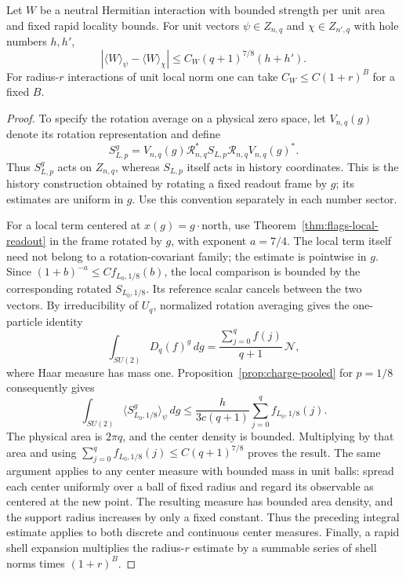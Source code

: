 \begin{corollary}\label{cor:charge-weak-average}
Let $W$ be a neutral Hermitian interaction with bounded strength per
unit area and fixed rapid locality bounds.  For unit vectors
$\psi\in Z_{n,q}$ and $\chi\in Z_{n',q}$ with hole numbers $h,h'$,
\begin{equation}\label{eq:charge-weak-average}
 |\langle W\rangle_\psi-\langle W\rangle_\chi|
 \le C_W(q+1)^{7/8}(h+h').
\end{equation}
For radius-$r$ interactions of unit local norm one can take
$C_W\le C(1+r)^B$ for a fixed $B$.
\end{corollary}

\begin{proof}
To specify the rotation average on a physical zero space, let
$V_{n,q}(g)$ denote its rotation representation and define
\[
 S_{L,p}^{g}=V_{n,q}(g)\mathcal R_{n,q}^*S_{L,p}
             \mathcal R_{n,q}V_{n,q}(g)^*.
\]
Thus $S_{L,p}^{g}$ acts on $Z_{n,q}$, whereas $S_{L,p}$ itself acts
in history coordinates.  This is the history construction obtained by
rotating a fixed readout frame by $g$; its estimates are uniform in
$g$.  Use this convention separately in each number sector.

For a local term centered at $x(g)=g\cdot\mathrm{north}$, use
Theorem~\ref{thm:flags-local-readout} in the frame rotated by $g$,
with exponent $a=7/4$.  The local term itself need not belong to a
rotation-covariant family; the estimate is pointwise in $g$.  Since
$(1+b)^{-a}\le C f_{L_0,1/8}(b)$, the local comparison is bounded
by the corresponding rotated $S_{L_0,1/8}$.  Its reference scalar
cancels between the two vectors.  By irreducibility of $U_q$,
normalized rotation averaging gives the one-particle identity
\begin{equation}\label{eq:charge-rotation-average}
 \int_{SU(2)} D_q(f)^{g}\,dg
 =\frac{\sum_{j=0}^q f(j)}{q+1}\,\mathcal N,
\end{equation}
where Haar measure has mass one.  Proposition~\ref{prop:charge-pooled}
for $p=1/8$ consequently gives
\[
 \int_{SU(2)}\langle S_{L_0,1/8}^{g}\rangle_\psi\,dg
 \le\frac{h}{3c(q+1)}\sum_{j=0}^q f_{L_0,1/8}(j).
\]
The physical area is $2\pi q$, and the center density is bounded.
Multiplying by that area and using
$\sum_{j=0}^q f_{L_0,1/8}(j)\le C(q+1)^{7/8}$ proves the result.
The same argument applies to any center measure with bounded mass
in unit balls: spread each center uniformly over a ball of fixed
radius and regard its observable as centered at the new point.  The
resulting measure has bounded area density, and the support radius
increases by only a fixed constant.  Thus the preceding integral
estimate applies to both discrete and continuous center measures.  Finally,
a rapid shell expansion multiplies the radius-$r$ estimate by a summable series of shell
norms times $(1+r)^B$.
\end{proof}

